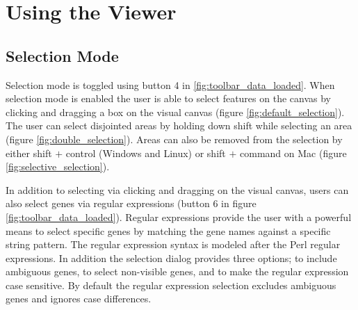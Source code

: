 \documentclass[10pt,a4paper,titlepage]{book}
\begin{document}
\chapter{Using the Viewer}
\label{ch:selection}

\section{Selection Mode}
Selection mode is toggled using button 4 in \ref{fig:toolbar_data_loaded}. When selection mode is enabled the user is able to select features on the canvas by clicking and dragging a box on the visual canvas (figure \ref{fig:default_selection}). The user can select disjointed areas by holding down shift while selecting an area (figure \ref{fig:double_selection}). Areas can also be removed from the selection by either shift $+$ control (Windows and Linux) or shift $+$ command on Mac (figure \ref{fig:selective_selection}).

In addition to selecting via clicking and dragging on the visual canvas, users can also select genes via regular expressions (button 6 in figure \ref{fig:toolbar_data_loaded}). Regular expressions provide the user with a powerful means to select specific genes by matching the gene names against a specific string pattern. The regular expression syntax is modeled after the Perl regular expressions.
In addition the selection dialog provides three options; to include ambiguous genes, to select non-visible genes, and to make the regular expression case sensitive.
By default the regular expression selection excludes ambiguous genes and ignores case differences.
\end{document}
